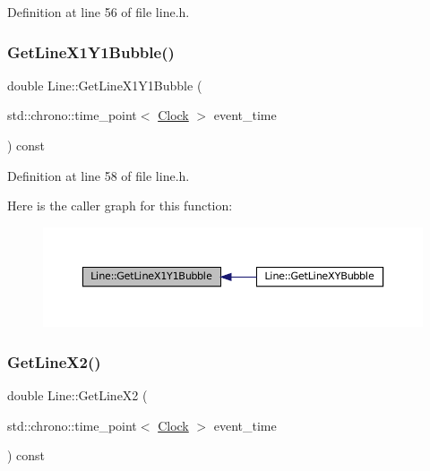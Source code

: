 Definition at line 56 of file line.\+h.

\mbox{\label{class_line_adc3c6c42d1b3d172e32fad59db2e3eaa}} 
\subsubsection{\texorpdfstring{Get\+Line\+X1\+Y1\+Bubble()}{GetLineX1Y1Bubble()}}
{\footnotesize\ttfamily double Line\+::\+Get\+Line\+X1\+Y1\+Bubble (\begin{DoxyParamCaption}\item[{std\+::chrono\+::time\+\_\+point$<$ \mbox{\hyperlink{universe_8h_a0ef8d951d1ca5ab3cfaf7ab4c7a6fd80}{Clock}} $>$}]{event\+\_\+time }\end{DoxyParamCaption}) const\hspace{0.3cm}{\ttfamily [inline]}}



Definition at line 58 of file line.\+h.

Here is the caller graph for this function\+:\nopagebreak
\begin{figure}[H]
\begin{center}
\leavevmode
\includegraphics[width=350pt]{class_line_adc3c6c42d1b3d172e32fad59db2e3eaa_icgraph}
\end{center}
\end{figure}
\mbox{\label{class_line_a9cdf38d7aaeadfa35136dd417865c189}} 
\subsubsection{\texorpdfstring{Get\+Line\+X2()}{GetLineX2()}}
{\footnotesize\ttfamily double Line\+::\+Get\+Line\+X2 (\begin{DoxyParamCaption}\item[{std\+::chrono\+::time\+\_\+point$<$ \mbox{\hyperlink{universe_8h_a0ef8d951d1ca5ab3cfaf7ab4c7a6fd80}{Clock}} $>$}]{event\+\_\+time }\end{DoxyParamCaption}) const\hspace{0.3cm}{\ttfamily [inline]}}



